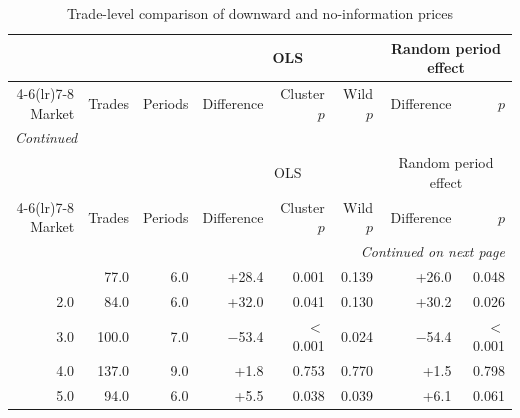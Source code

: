 \footnotesize
\begin{longtable}{rrrrrrrr}
\caption{Trade-level comparison of downward and no-information prices}\label{tab:app-noinfo-trades}\\
\toprule
 & & & \multicolumn{3}{c}{OLS} & \multicolumn{2}{c}{Random period effect} \\ \cmidrule(lr){4-6}\cmidrule(lr){7-8}
Market & Trades & Periods & Difference & Cluster $p$ & Wild $p$ & Difference & $p$ \\
\midrule
\endfirsthead
\multicolumn{8}{l}{\textit{Continued}}\\
\toprule
 & & & \multicolumn{3}{c}{OLS} & \multicolumn{2}{c}{Random period effect} \\ \cmidrule(lr){4-6}\cmidrule(lr){7-8}
Market & Trades & Periods & Difference & Cluster $p$ & Wild $p$ & Difference & $p$ \\
\midrule
\endhead
\midrule
\multicolumn{8}{r}{\textit{Continued on next page}}\\
\endfoot
\bottomrule
\endlastfoot
1.0 & 77.0 & 6.0 & +28.4 & 0.001 & 0.139 & +26.0 & 0.048 \\
2.0 & 84.0 & 6.0 & +32.0 & 0.041 & 0.130 & +30.2 & 0.026 \\
3.0 & 100.0 & 7.0 & $-$53.4 & $<$0.001 & 0.024 & $-$54.4 & $<$0.001 \\
4.0 & 137.0 & 9.0 & +1.8 & 0.753 & 0.770 & +1.5 & 0.798 \\
5.0 & 94.0 & 6.0 & +5.5 & 0.038 & 0.039 & +6.1 & 0.061 \\
\end{longtable}
